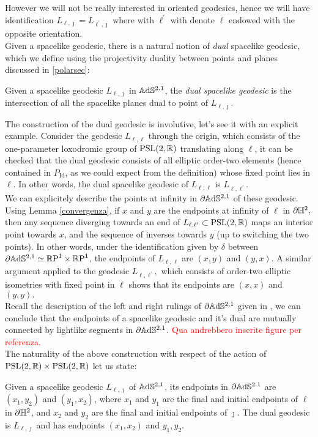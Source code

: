 However we will not be really interested in oriented geodesics, hence we will have identification $L_{\ell,\jmath}=L_{\ell^{\prime},\jmath}$ where with $\ell^{\prime} $ with denote $\ell$ endowed with the opposite orientation.\\
Given a spacelike geodesic, there is a natural notion of \textit{dual} spacelike geodesic, which we define using the projectivity duality between points and planes discussed in \ref{polarsec}: 
\begin{definition}
    Given a spacelike geodesic $L_{\ell,\jmath}$ in $\mathbb{A}\mathrm{d}\mathbb{S}^{2,1}$, the \textit{dual spacelike geodesic} is the intersection of all the spacelike planes dual to point of $L_{\ell,\jmath}.$  
\end{definition}

The construction of the dual geodesic is involutive, let's see it with an explicit example. Consider the geodesic $L_{\ell,\ell}$ through the origin, which consists of the one-parameter loxodromic group of $\text{PSL}(2,\mathbb{R})$ translating along $\ell$, it can be checked that the dual geodesic consists of all elliptic order-two elements (hence contained in $P_{\text{Id}}$, as we could expect from the definition) whose fixed point lies in $\ell$. In other words, the dual spacelike geodesic of $L_{\ell,\ell}$ is $L_{\ell,\ell^{\prime}}.$\\
We can explicitely describe the points at infinity in $\partial\mathbb{A}\mathrm{d}\mathbb{S}^{2,1}$ of these geodesic. Using Lemma \ref{convergenza}, if $x$ and $y$ are the endpoints at infinity of $\ell$ in $\partial\mathbb{H}^2,$ then any sequence diverging towards an end of $L_{\ell,\ell^{\prime}}\subset \text{PSL}(2,\mathbb{R})$ maps an interior point towards $x$, and the sequence of inverses towards $y$ (up to switching the two points). In other words, under the identification given by $\delta$ between $\partial\mathbb{A}\mathrm{d}\mathbb{S}^{2,1}\simeq\mathbb{R}\text{P}^1\times\mathbb{R}\text{P}^1$, the endpoints of $L_{\ell,\ell}$ are $(x,y)$ and $(y,x)$. A similar argument applied to the geodesic $L_{\ell,\ell^{\prime} },$ which consists of order-two elliptic isometries with fixed point in $\ell$ shows that its endpoints are $(x,x)$ and $(y,y).$\\
Recall the description of the left and right rulings of $\partial\mathbb{A}\mathrm{d}\mathbb{S}^{2,1}$ given in , we can conclude that the endpoints of a spacelike geodesic and it's dual are mutually connected by lightlike segments in $\partial\mathbb{A}\mathrm{d}\mathbb{S}^{2,1}$. \textcolor{red}{Qua andrebbero inserite figure per referenza.}\\
The naturality of the above construction with respect of the action of $\text{PSL}(2,\mathbb{R})\times\text{PSL}(2,\mathbb{R})$ let us state: 
\begin{proposition}
    Given a spacelike geodesic $L_{\ell,\jmath}$ of $\mathbb{A}\mathrm{d}\mathbb{S}^{2,1}$, its endpoints in $\partial \mathbb{A}\mathrm{d}\mathbb{S}^{2.1}$ are $(x_1,y_2)$ and $(y_1,x_2)$, where $x_1$ and $y_1$ are the final and initial endpoints of $\ell$ in $\partial\mathbb{H}^2$, and $x_2$ and $y_2$ are the final and initial endpoints of $\jmath$. The dual geodesic is $L_{\ell,\jmath}$ and has endpoints $(x_1,x_2)$ and $y_1,y_2.$
\end{proposition}


